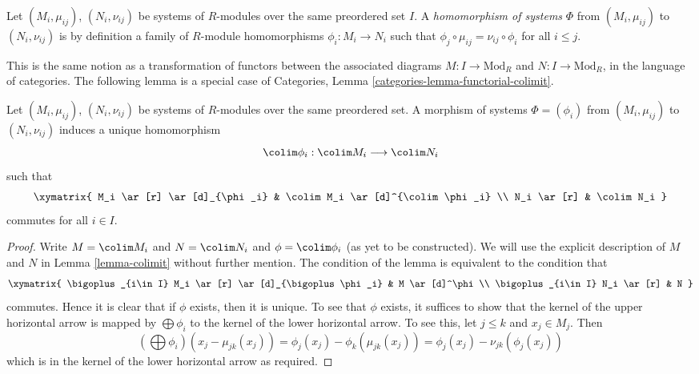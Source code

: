 \begin{definition}
\label{definition-homomorphism-directed-systems}
Let $(M_i, \mu_{ij})$, $(N_i, \nu_{ij})$ be
systems of $R$-modules over the same preordered set $I$.
A {\it homomorphism of systems} $\Phi$ from $(M_i, \mu_{ij})$ to
$(N_i, \nu_{ij})$ is by definition a family of $R$-module homomorphisms
$\phi_i : M_i \to N_i$
such that $\phi_j \circ \mu_{ij} = \nu_{ij} \circ \phi_i$
for all $i \leq j$.
\end{definition}

\noindent
This is the same notion as a transformation of functors
between the associated diagrams $M : I \to \text{Mod}_R$
and $N : I \to \text{Mod}_R$, in the language of
categories.
The following lemma is a special case of
Categories, Lemma \ref{categories-lemma-functorial-colimit}.

\begin{lemma}
\label{lemma-homomorphism-limit}
Let $(M_i, \mu_{ij})$, $(N_i, \nu_{ij})$ be
systems of $R$-modules over the same preordered set.
A morphism of systems $\Phi = (\phi_i)$ from $(M_i, \mu_{ij})$ to
$(N_i, \nu_{ij})$ induces a unique homomorphism
$$
\colim \phi_i : \colim M_i \longrightarrow \colim N_i
$$
such that
$$
\xymatrix{
M_i \ar[r] \ar[d]_{\phi_i} & \colim M_i \ar[d]^{\colim \phi_i} \\
N_i \ar[r] & \colim N_i
}
$$
commutes for all $i \in I$.
\end{lemma}

\begin{proof}
Write $M = \colim M_i$ and $N = \colim N_i$ and $\phi = \colim \phi_i$
(as yet to be constructed). We will use the explicit description of $M$
and $N$ in Lemma \ref{lemma-colimit} without further mention.
The condition of the lemma is equivalent to the condition that
$$
\xymatrix{
\bigoplus_{i\in I} M_i \ar[r] \ar[d]_{\bigoplus\phi_i} & M \ar[d]^\phi \\
\bigoplus_{i\in I} N_i \ar[r] & N
}
$$
commutes. Hence it is clear that if $\phi$ exists, then it is unique.
To see that $\phi$ exists, it suffices to show that the kernel of the
upper horizontal arrow is mapped by $\bigoplus \phi_i$ to the kernel
of the lower horizontal arrow. To see this, let $j \leq k$ and
$x_j \in M_j$. Then
$$
(\bigoplus \phi_i)(x_j - \mu_{jk}(x_j))
=
\phi_j(x_j) - \phi_k(\mu_{jk}(x_j))
=
\phi_j(x_j) - \nu_{jk}(\phi_j(x_j))
$$
which is in the kernel of the lower horizontal arrow as required.
\end{proof}

